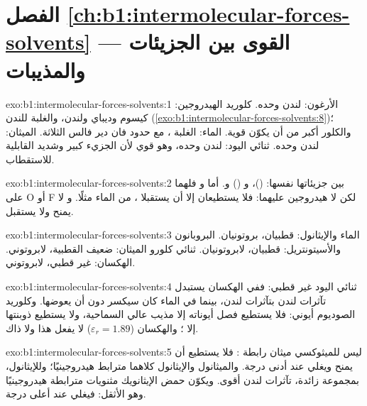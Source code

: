 \section*{الفصل \ref{ch:b1:intermolecular-forces-solvents} --- القوى بين الجزيئات والمذيبات}

\begin{solution}{exo:b1:intermolecular-forces-solvents:1}
الأرغون: لندن وحده. كلوريد الهيدروجين: كيسوم وديباي ولندن، والغلبة
للندن (\cref{exo:b1:intermolecular-forces-solvents:8})؛ والكلور
أكبر من أن يكوّن  قوية. الماء: الغلبة ، مع
حدود فان دير فالس الثلاثة. الميثان: لندن وحده. ثنائي اليود: لندن
وحده، وهو قوي لأن الجزيء كبير وشديد القابلية للاستقطاب.
\end{solution}

\begin{solution}{exo:b1:intermolecular-forces-solvents:2}
بين جزيئاتها نفسها:  ()، و
() و. أما  و فلهما  على O
أو F لكن لا هيدروجين عليهما: فلا يستطيعان إلا أن يستقبلا ، من
الماء مثلًا. و لا يمنح ولا يستقبل.
\end{solution}

\begin{solution}{exo:b1:intermolecular-forces-solvents:3}
الماء والإيثانول: قطبيان، بروتونيان. البروبانون والأسيتونتريل: قطبيان،
لابروتونيان. ثنائي كلورو الميثان: ضعيف القطبية، لابروتوني. الهكسان: غير قطبي، لابروتوني.
\end{solution}

\begin{solution}{exo:b1:intermolecular-forces-solvents:4}
ثنائي اليود غير قطبي: ففي الهكسان يستبدل تآثرات لندن بتآثرات
لندن، بينما في الماء كان سيكسر  دون أن
يعوضها. وكلوريد الصوديوم أيوني: فلا يستطيع فصل أيوناته إلا مذيب عالي
السماحية، ولا يستطيع ذوبنتها إلا ؛ والهكسان
($\varepsilon_r = 1.89$) لا يفعل هذا ولا ذاك.
\end{solution}

\begin{solution}{exo:b1:intermolecular-forces-solvents:5}
ليس للميثوكسي ميثان رابطة : فلا يستطيع أن يمنح  ويغلي
عند أدنى درجة. والميثانول والإيثانول كلاهما مترابط هيدروجينيًا؛ وللإيثانول، بمجموعة
 زائدة، تآثرات لندن أقوى. ويكوّن حمض الإيثانويك
مثنويات مترابطة هيدروجينيًا وهو الأثقل: فيغلي عند أعلى درجة.
\end{solution}

